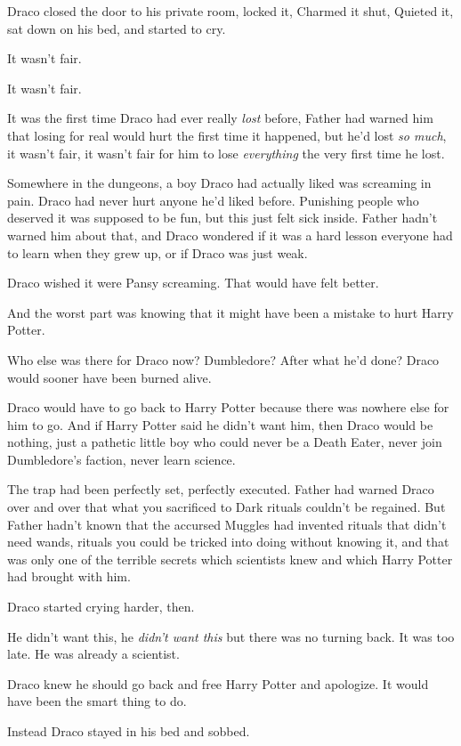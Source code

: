 Draco closed the door to his private room, locked it, Charmed it shut, Quieted
it, sat down on his bed, and started to cry.

It wasn't fair.

It wasn't fair.

It was the first time Draco had ever really \emph{lost} before, Father had
warned him that losing for real would hurt the first time it happened, but he'd
lost \emph{so much}, it wasn't fair, it wasn't fair for him to lose
\emph{everything} the very first time he lost.

Somewhere in the dungeons, a boy Draco had actually liked was screaming in
pain. Draco had never hurt anyone he'd liked before. Punishing people who
deserved it was supposed to be fun, but this just felt sick inside. Father
hadn't warned him about that, and Draco wondered if it was a hard lesson
everyone had to learn when they grew up, or if Draco was just weak.

Draco wished it were Pansy screaming. That would have felt better.

And the worst part was knowing that it might have been a mistake to hurt Harry
Potter.

Who else was there for Draco now? Dumbledore? After what he'd done? Draco would
sooner have been burned alive.

Draco would have to go back to Harry Potter because there was nowhere else for
him to go. And if Harry Potter said he didn't want him, then Draco would be
nothing, just a pathetic little boy who could never be a Death Eater, never
join Dumbledore's faction, never learn science.

The trap had been perfectly set, perfectly executed. Father had warned Draco
over and over that what you sacrificed to Dark rituals couldn't be regained.
But Father hadn't known that the accursed Muggles had invented rituals that
didn't need wands, rituals you could be tricked into doing without knowing it,
and that was only one of the terrible secrets which scientists knew and which
Harry Potter had brought with him.

Draco started crying harder, then.

He didn't want this, he \emph{didn't want this} but there was no turning back.
It was too late. He was already a scientist.

Draco knew he should go back and free Harry Potter and apologize. It would have
been the smart thing to do.

Instead Draco stayed in his bed and sobbed.

